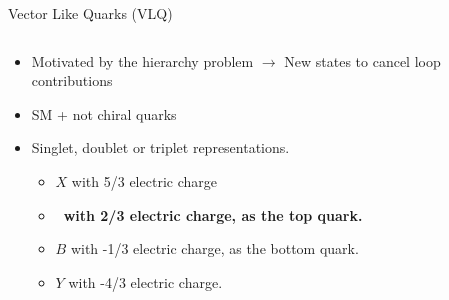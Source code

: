 \begin{frame}{Vector Like Quarks (VLQ)}
\vspace{-.3cm}
\begin{columns}

\begin{column}{.50\textwidth}
\begin{block}{}
\begin{itemize}\scriptsize
\item Motivated by the hierarchy problem $\to$ New states to cancel loop contributions
\item SM + not chiral quarks
\item Singlet, doublet or triplet representations.
  \begin{itemize}\scriptsize
  \item $X$ with 5/3 electric charge
  \item \textbf{\Tp~with 2/3 electric charge, as the top quark.}
  \item $B$ with -1/3 electric charge, as the bottom quark.
  \item $Y$ with -4/3 electric charge.
  \end{itemize}
\end{itemize}
\end{block}
\end{column}


\end{columns}
\end{frame}
